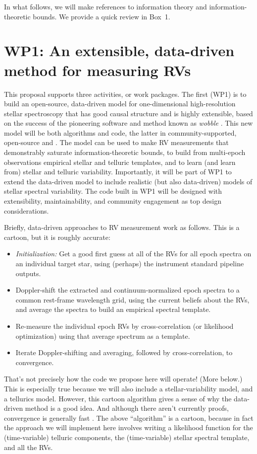 \documentclass[12pt]{article}
\begin{document}
In what follows, we will make references to information theory and information-theoretic bounds.
We provide a quick review in Box~1.

\section{WP1: An extensible, data-driven method for measuring RVs}

This proposal supports three activities, or work packages. The first (WP1) is to build an open-source, data-driven model for one-dimensional high-resolution stellar spectroscopy that has good causal structure and is highly extensible, based on the success of the pioneering software and method known as \textsl{wobble} \cite{Bedell2019}.
This new model will be both algorithms and code, the latter in community-supported, open-source  and  \cite{jax}.
The model can be used to make RV measurements that demonstrably saturate information-theoretic bounds, to build from multi-epoch observations empirical stellar and telluric templates, and to learn (and learn from) stellar and telluric variability.
Importantly, it will be part of WP1 to extend the data-driven model to include realistic (but also data-driven) models of stellar spectral variability.
The code built in WP1 will be designed with extensibility, maintainability, and community engagement as top design considerations.

Briefly, data-driven approaches to RV measurement work as follows. This is a cartoon, but it is roughly accurate:
\begin{itemize}
    \item \emph{Initialization:} Get a good first guess at all of the RVs for all epoch spectra on an individual target star, using (perhaps) the instrument standard pipeline outputs.
    \item Doppler-shift the extracted and continuum-normalized epoch spectra to a common rest-frame wavelength grid, using the current beliefs about the RVs, and average the spectra to build an empirical spectral template.
    \item Re-measure the individual epoch RVs by cross-correlation (or likelihood optimization) using that average spectrum as a template.
    \item Iterate Doppler-shifting and averaging, followed by cross-correlation, to convergence.
\end{itemize}
That's not precisely how the code we propose here will operate! (More below.)
This is especially true because we will also include a stellar-variability model, and a tellurics model.
However, this cartoon algorithm gives a sense of why the data-driven method is a good idea.
And although there aren't currently proofs, convergence is generally fast \cite{Bedell2019}.
The above ``algorithm'' is a cartoon, because in fact the approach we will implement here involves writing a likelihood function for the (time-variable) telluric components, the (time-variable) stellar spectral template, and all the RVs.
\end{document}
